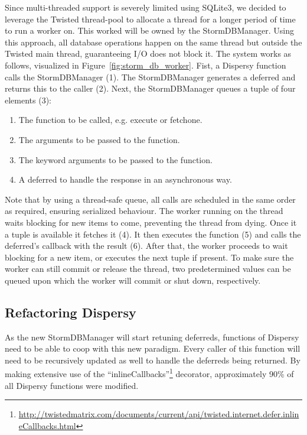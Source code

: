 Since multi-threaded support is severely limited using SQLite3, we decided to leverage the Twisted thread-pool to allocate a thread for a longer period of time to run a worker on.
This worked will be owned by the StormDBManager.
Using this approach, all database operations happen on the same thread but outside the Twisted main thread, guaranteeing I/O does not block it.
The system works as follows, visualized in Figure~\ref{fig:storm_db_worker}.
Fist, a Dispersy function calls the StormDBManager (1).
The StormDBManager generates a deferred and returns this to the caller (2).
Next, the StormDBManager queues a tuple of four elements (3):

\begin{enumerate}
	\item The function to be called, e.g. execute or fetchone.
	\item The arguments to be passed to the function.
	\item The keyword arguments to be passed to the function.
	\item A deferred to handle the response in an asynchronous way.
\end{enumerate}

Note that by using a thread-safe queue, all calls are scheduled in the same order as required, ensuring serialized behaviour.
The worker running on the thread waits blocking for new items to come, preventing the thread from dying.
Once it a tuple is available it fetches it (4).
It then executes the function (5) and calls the deferred's callback with the result (6).
After that, the worker proceeds to wait blocking for a new item, or executes the next tuple if present.
To make sure the worker can still commit or release the thread, two predetermined values can be queued upon which the worker will commit or shut down, respectively.

\subsection{Refactoring Dispersy}

As the new StormDBManager will start retuning deferreds, functions of Dispersy need to be able to coop with this new paradigm.
Every caller of this function will need to be recursively updated as well to handle the deferreds being returned.
By making extensive use of the \enquote{inlineCallbacks}\footnote{\url{http://twistedmatrix.com/documents/current/api/twisted.internet.defer.inlineCallbacks.html}} decorator, approximately 90\% of all Dispersy functions were modified. 
